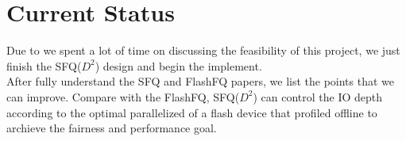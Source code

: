 \section{Current Status}

Due to we spent a lot of time on discussing the feasibility of this project, we just finish the SFQ($D^2$) design and begin the implement.\\
After fully understand the SFQ and FlashFQ papers, we list the points that we can improve. Compare with the FlashFQ, SFQ($D^2$) can control the IO depth according to the optimal parallelized of a flash device that profiled offline to archieve the fairness and performance goal.